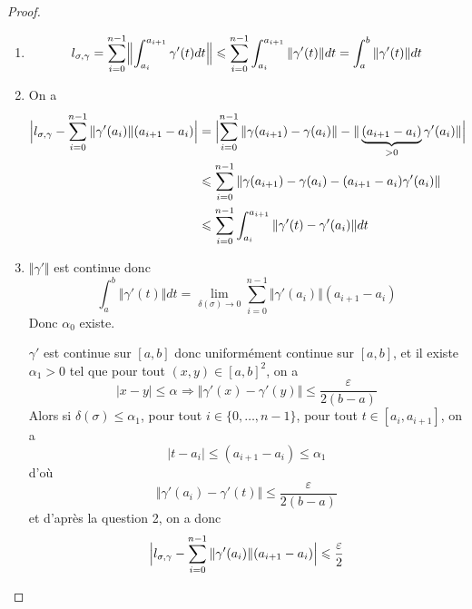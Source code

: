 \begin{proof}
	\phantom{}
	\begin{enumerate}
		\item 
		\begin{equation}l_{\sigma,\gamma}=\sum_{i=0}^{n-1}\Bigl\Vert\int_{a_{i}}^{a_{i+1}}\gamma'(t)dt\Bigr\Vert\leqslant\sum_{i=0}^{n-1}\int_{a_{i}}^{a_{i+1}}\Vert\gamma'(t)\Vert dt=\int_{a}^{b}\Vert\gamma'(t)\Vert dt\end{equation}

		\item On a 
		\begin{align}
			\Bigl\vert l_{\sigma,\gamma}-\sum_{i=0}^{n-1}\Vert\gamma'(a_{i})\Vert(a_{i+1}-a_{i})\Bigr\vert
			&=\Bigl\vert\sum_{i=0}^{n-1}\Vert\gamma(a_{i+1})-\gamma(a_{i})\Vert-\Vert\underbrace{(a_{i+1}-a_{i})}_{>0}\gamma'(a_{i})\Vert\Bigr\vert\\
			&\leqslant\sum_{i=0}^{n-1}\Vert\gamma(a_{i+1})-\gamma(a_{i})-(a_{i+1}-a_{i})\gamma'(a_{i})\Vert\\
			&\leqslant\sum_{i=0}^{n-1}\int_{a_{i}}^{a_{i+1}}\Vert\gamma'(t)-\gamma'(a_{i})\Vert dt
		\end{align}

		\item $\Vert\gamma'\Vert$ est continue donc 
		\begin{equation}\int_{a}^{b}\Vert\gamma'(t)\Vert dt=\lim\limits_{\delta(\sigma)\to0}\sum_{i=0}^{n-1}\Vert\gamma'(a_{i})\Vert(a_{i+1}-a_{i})\end{equation}
		Donc $\alpha_{0}$ existe.

		$\gamma'$ est continue sur $[a,b]$ donc uniformément continue sur $[a,b]$, et il existe $\alpha_{1}>0$ tel que pour tout $(x,y)\in[a,b]^{2}$, on a 
		\begin{equation}\vert x-y\vert\leqslant\alpha_{}\Rightarrow\Vert\gamma'(x)-\gamma'(y)\Vert\leqslant\frac{\varepsilon}{2(b-a)}\end{equation}
		Alors si $\delta(\sigma)\leqslant\alpha_{1}$, pour tout $i\in\{0,\dots,n-1\}$, pour tout $t\in[a_{i},a_{i+1}]$, on a
		\begin{equation}\vert t-a_{i}\vert\leqslant(a_{i+1}-a_{i})\leqslant\alpha_{1}\end{equation}
		d'où 
		\begin{equation}\Vert \gamma'(a_{i})-\gamma'(t)\Vert\leqslant\frac{\varepsilon}{2(b-a)}\end{equation}
		et d'après la question 2, on a donc 
		\begin{equation}\Bigl\vert l_{\sigma,\gamma}-\sum_{i=0}^{n-1}\Vert\gamma'(a_{i})\Vert(a_{i+1}-a_{i})\Bigr\vert\leqslant\frac{\varepsilon}{2}\end{equation}


\end{enumerate}
\end{proof}
